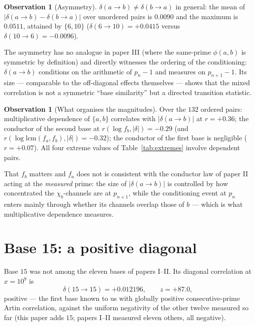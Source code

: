 \documentclass[11pt,reqno]{amsart}
\theoremstyle{plain}
\theoremstyle{definition}
\newtheorem{observation}[theorem]{Observation}
\begin{document}
\begin{observation}[Asymmetry]
\label{obs:asym}
$\delta(a \to b) \neq \delta(b \to a)$ in general: the mean of
$|\delta(a \to b) - \delta(b \to a)|$ over unordered pairs is $0.0090$ and
the maximum is $0.0511$, attained by $\{6, 10\}$
($\delta(6 \to 10) = +0.0415$ versus $\delta(10 \to 6) = -0.0096$).
\end{observation}

The asymmetry has no analogue in paper III (where the same-prime $\phi(a,b)$
is symmetric by definition) and directly witnesses the ordering of the
conditioning: $\delta(a \to b)$ conditions on the arithmetic of $p_n - 1$
and measures on $p_{n+1} - 1$. Its size --- comparable to the off-diagonal
effects themselves --- shows that the mixed correlation is not a symmetric
``base similarity'' but a directed transition statistic.

\begin{observation}[What organises the magnitudes]
\label{obs:organise}
Over the $132$ ordered pairs: multiplicative dependence of $\{a, b\}$
correlates with $|\delta(a \to b)|$ at $r = +0.36$; the conductor of the
second base at $r(\log f_b, |\delta|) = -0.29$ (and
$r(\log \mathrm{lcm}(f_a, f_b), |\delta|) = -0.32$); the conductor of the
first base is negligible ($r = +0.07$). All four extreme values of
Table~\ref{tab:extremes} involve dependent pairs.
\end{observation}

That $f_b$ matters and $f_a$ does not is consistent with the conductor law
of paper II acting at the \emph{measured} prime: the size of
$|\delta(a \to b)|$ is controlled by how concentrated the $\chi_b$-channels
are at $p_{n+1}$, while the conditioning event at $p_n$ enters mainly
through whether its channels overlap those of $b$ --- which is what
multiplicative dependence measures.

\section{Base 15: a positive diagonal}
\label{sec:base15}

Base $15$ was not among the eleven bases of papers I--II. Its diagonal
correlation at $x = 10^9$ is
\[
  \delta(15 \to 15) = +0.012196, \qquad z = +87.0,
\]
positive --- the first base known to us with globally positive
consecutive-prime Artin correlation, against the uniform negativity of the
other twelve measured so far (this paper adds $15$; papers I--II measured
eleven others, all negative).
\end{document}
